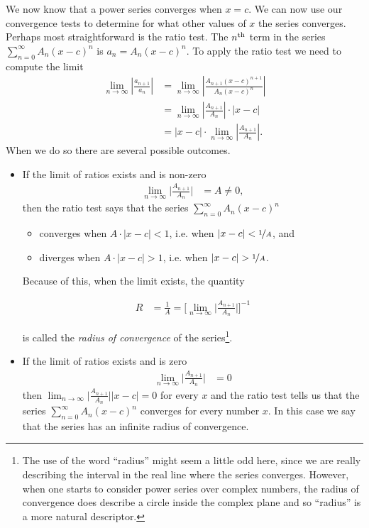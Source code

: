 We now know that a power series converges when $x=c$. We can now
use our convergence tests to determine for what other values
of $x$ the series converges. Perhaps most straightforward is the
ratio test. The $n^{\rm th}$ term in the series
$\sum_{n=0}^\infty A_n(x-c)^n$ is $a_n=A_n(x-c)^n$.
To apply the ratio test we need to compute the limit
\begin{align*}
\lim_{n \to \infty}\left|\frac{a_{n+1}}{a_n}\right|
&=\lim_{n \to \infty} \left|\frac{A_{n+1}(x-c)^{n+1}}{A_n(x-c)^n}\right|\\
&=\lim_{n \to \infty} \left|\frac{A_{n+1}}{A_n}\right|\cdot |x-c|\\
&= |x-c| \cdot \lim_{n \to \infty} \left|\frac{A_{n+1}}{A_n}\right|.
\end{align*}
When we do so there are several possible outcomes.
\begin{itemize}
\item If the limit of ratios exists and is non-zero
\begin{align*}
\lim_{n\rightarrow\infty}\Big|\frac{A_{n+1}}{A_n}\Big| &= A \neq 0,
\end{align*}
then the ratio test says that the series $\sum_{n=0}^\infty A_n(x-c)^n$
\begin{itemize}
 \item converges when $A \cdot |x-c|<1$, i.e. when $|x-c|<\nicefrac{1}{A}$,  and
 \item diverges when $A \cdot |x-c|>1$, i.e. when $|x-c| > \nicefrac{1}{A}$.
\end{itemize}
Because of this, when the limit exists, the quantity
\begin{impeqn}\label{eq:SRradConv}
\begin{align*}
R&=\frac{1}{A}
 =\bigg[\lim_{n\rightarrow\infty}\Big|\frac{A_{n+1}}{A_n}\Big|\bigg]^{-1}
\end{align*}
\end{impeqn}
is called the \emph{radius of convergence} of the series\footnote{The
use of the word ``radius'' might seem a little odd here, since we
are really describing the interval in the real line where the series
converges. However, when one starts to consider power series over complex numbers, the radius of convergence does describe a circle inside the
complex plane and so ``radius'' is a more natural descriptor.}.


\item If the limit of ratios exists and is zero
\begin{align*}
\lim_{n\rightarrow\infty}\Big|\frac{A_{n+1}}{A_n}\Big| &= 0
\end{align*}
then $\lim_{n\rightarrow\infty}\Big|\frac{A_{n+1}}{A_n}\Big||x-c| =0$
for every $x$ and the ratio test tells us that the
series  $\sum_{n=0}^\infty A_n(x-c)^n$ converges for every number $x$.
In this case we say that the series has an infinite radius of convergence.


\end{itemize}
